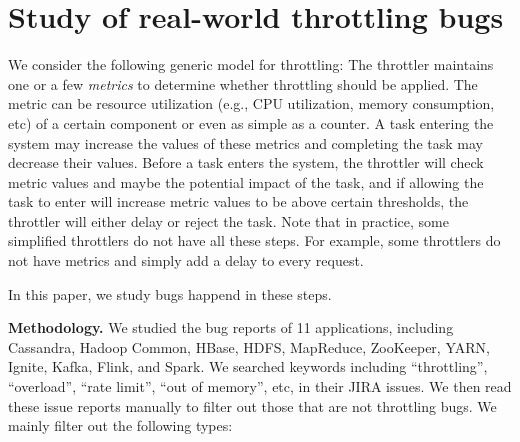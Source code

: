 \section{Study of real-world throttling bugs}

We consider the following generic model for throttling: The throttler maintains one or a few \emph{metrics}
to determine whether throttling should be applied. The metric can be resource utilization (e.g., CPU utilization, memory consumption, etc) 
of a certain component or even as simple as a counter. A task entering the system may increase the values
of these metrics and completing the task may decrease their values. Before a task enters the system,
the throttler will check metric values and maybe the potential impact of the task, and if allowing the task
to enter will increase metric values to be above certain thresholds, the throttler will either delay or reject the
task. Note that in practice, some simplified throttlers do not have all these steps. For example, some throttlers do not
have metrics and simply add a delay to every request.

In this paper, we study bugs happend in these steps.

\vspace{.1in}
\noindent
\textbf{Methodology.} We studied the bug reports of 11 applications, including Cassandra, Hadoop Common, 
HBase, HDFS, MapReduce, ZooKeeper, YARN, Ignite, Kafka, Flink, and Spark. We searched keywords including ``throttling'', ``overload'',
``rate limit'', ``out of memory'', etc, in their JIRA issues. We then read these issue reports manually to filter out those
that are not throttling bugs. We mainly filter out the following types:

